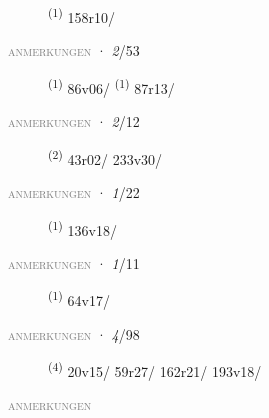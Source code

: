 \begin{description}
    \item[]  \textsuperscript{(1)} \mbox{158r10/}
\end{description}
\textsc{\textcolor{gray}{anmerkungen}}
\ENTRYEND
\noindent{} · \textit{2}/53 \LEMMALINE
\begin{description}
    \item[]  \textsuperscript{(1)} \mbox{86v06/} \CASEBREAK {} \textsuperscript{(1)} \mbox{87r13/}
\end{description}
\textsc{\textcolor{gray}{anmerkungen}}
\ENTRYEND
\noindent{} · \textit{2}/12 \LEMMALINE
\begin{description}
    \item[]  \textsuperscript{(2)} \mbox{43r02/} \mbox{233v30/}
\end{description}
\textsc{\textcolor{gray}{anmerkungen}}
\ENTRYEND
\noindent{} · \textit{1}/22 \LEMMALINE
\begin{description}
    \item[]  \textsuperscript{(1)} \mbox{136v18/}
\end{description}
\textsc{\textcolor{gray}{anmerkungen}}
\ENTRYEND
\noindent{} · \textit{1}/11 \LEMMALINE
\begin{description}
    \item[]  \textsuperscript{(1)} \mbox{64v17/}
\end{description}
\textsc{\textcolor{gray}{anmerkungen}}
\ENTRYEND
\noindent{} · \textit{4}/98 \LEMMALINE
\begin{description}
    \item[]  \textsuperscript{(4)} \mbox{20v15/} \mbox{59r27/} \mbox{162r21/} \mbox{193v18/}
\end{description}
\textsc{\textcolor{gray}{anmerkungen}}
